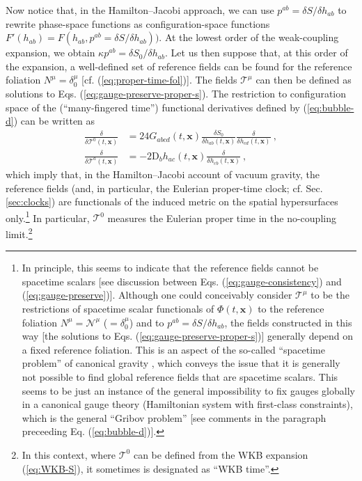 \documentclass[12pt]{iopart}
\def\eq#1{\begin{equation}\begin{aligned}#1\end{aligned}\end{equation}}
\def\eref#1{(\ref{eq:#1})}
\def\x{\mathbf{x}}
\def\T{\mathcal{T}}
\begin{document}
Now notice that, in the Hamilton--Jacobi approach, we can use $p^{ab} = \delta S/\delta h_{ab}$ to rewrite phase-space functions as configuration-space functions $F'(h_{ab})=F(h_{ab},p^{ab}=\delta S/\delta h_{ab}))$. At the lowest order of the weak-coupling expansion, we obtain $\kappa p^{ab} = \delta S_0/\delta h_{ab}$.  Let us then suppose that, at this order of the expansion, a well-defined set of reference fields can be found for the reference foliation $N^{\mu}=\delta^{\mu}_0$ [cf. \eref{proper-time-fol}]. The fields $\mathcal{T}^{\mu}$ can then be defined as solutions to Eqs. \eref{gauge-preserve-proper-s}. The restriction to configuration space of the  (``many-fingered time'') functional derivatives defined by \eref{bubble-d} can be written as
\eq{\label{eq:bubble-d-HJ}
\frac{\delta}{\delta\T^{0}(t,\x)} &= 24G_{abcd}(t,\x)\frac{\delta S_0}{\delta h_{ab}(t,\x)}\frac{\delta}{\delta h_{cd}(t,\x)}\ , \\
\frac{\delta}{\delta\T^{a}(t,\x)} &= -2\mathrm{D}_bh_{ac}(t,\x)\frac{\delta}{\delta h_{cb}(t,\x)}  \ , 
}
which imply that, in the Hamilton--Jacobi account of vacuum gravity, the reference fields (and, in particular, the Eulerian proper-time clock; cf. Sec. \ref{sec:clocks}) are functionals of the induced metric on the spatial hypersurfaces only.\footnote{In principle, this seems to indicate that the reference fields cannot be spacetime scalars [see discussion between Eqs. \eref{gauge-consistency} and \eref{gauge-preserve}]. Although one could conceivably consider $\mathcal{T}^{\mu}$ to be the restrictions of spacetime scalar functionals of $\Phi(t,\x)$ to the reference foliation $N^{\mu} = \mathcal{N}^{\mu}$ ($=\delta^{\mu}_0$) and to $p^{ab} = \delta S/\delta h_{ab}$, the fields constructed in this way [the solutions to Eqs. \eref{gauge-preserve-proper-s}] generally depend on a fixed reference foliation. This is an aspect of the so-called ``spacetime problem'' of canonical gravity \citep{Isham:1992ms,Kuchar:1991qf}, which conveys the issue that it is generally not possible to find global reference fields that are spacetime scalars. This seems to be just an instance of the general impossibility to fix gauges globally in a canonical gauge theory (Hamiltonian system with first-class constraints), which is the general ``Gribov problem'' \citep{HT:book} [see comments in the paragraph preceeding Eq. \eref{bubble-d}].} In particular, $\T^0$ measures the Eulerian proper time in the no-coupling limit.\footnote{In this context, where $\T^0$ can be defined from the WKB expansion \eref{WKB-S}, it sometimes is designated as ``WKB time''.}
\end{document}
